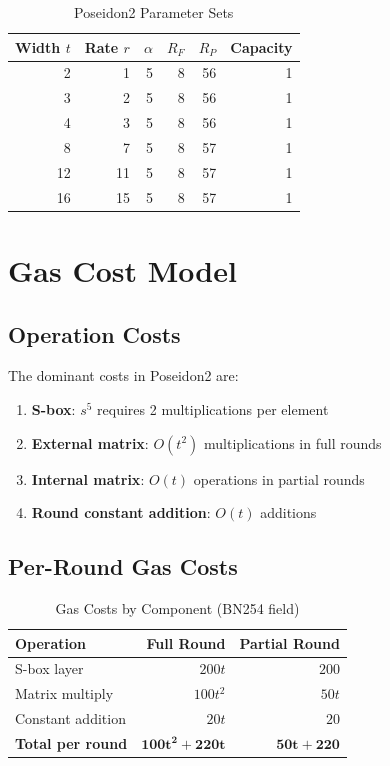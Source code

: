 \documentclass[11pt,a4paper]{article}
\begin{document}
\begin{table}[htbp]
\centering
\caption{Poseidon2 Parameter Sets}
\label{tab:params}
\begin{tabular}{@{}rrrrrr@{}}
\toprule
Width $t$ & Rate $r$ & $\alpha$ & $R_F$ & $R_P$ & Capacity \\
\midrule
2 & 1 & 5 & 8 & 56 & 1 \\
3 & 2 & 5 & 8 & 56 & 1 \\
4 & 3 & 5 & 8 & 56 & 1 \\
8 & 7 & 5 & 8 & 57 & 1 \\
12 & 11 & 5 & 8 & 57 & 1 \\
16 & 15 & 5 & 8 & 57 & 1 \\
\bottomrule
\end{tabular}
\end{table}

\section{Gas Cost Model}

\subsection{Operation Costs}

The dominant costs in Poseidon2 are:
\begin{enumerate}
    \item \textbf{S-box}: $s^5$ requires 2 multiplications per element
    \item \textbf{External matrix}: $O(t^2)$ multiplications in full rounds
    \item \textbf{Internal matrix}: $O(t)$ operations in partial rounds
    \item \textbf{Round constant addition}: $O(t)$ additions
\end{enumerate}

\subsection{Per-Round Gas Costs}

\begin{table}[htbp]
\centering
\caption{Gas Costs by Component (BN254 field)}
\label{tab:gascosts}
\begin{tabular}{@{}lrr@{}}
\toprule
Operation & Full Round & Partial Round \\
\midrule
S-box layer & $200t$ & $200$ \\
Matrix multiply & $100t^2$ & $50t$ \\
Constant addition & $20t$ & $20$ \\
\midrule
\textbf{Total per round} & $\mathbf{100t^2 + 220t}$ & $\mathbf{50t + 220}$ \\
\bottomrule
\end{tabular}
\end{table}
\end{document}
